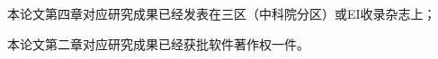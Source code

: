 \begin{inno}

\begin{enumerate}[label={[\arabic*]}]
  
  \item 本论文第四章对应研究成果已经发表在三区（中科院分区）或EI收录杂志上；
    
  \item 本论文第二章对应研究成果已经获批软件著作权一件。
\end{enumerate}

\end{inno}
